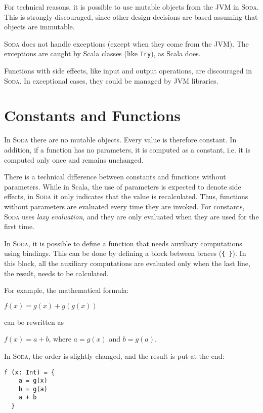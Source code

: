 \documentclass[12pt,a4paper]{book}
\newcommand{\srccode}[1]{\texttt{{#1}}}
\newcommand{\Soda}{\textsc{Soda}\xspace}
\begin{document}
    For technical reasons, it is possible to use mutable objects from the JVM in \Soda.
    This is strongly discouraged, since other design decisions are based assuming that objects are immutable.

    \Soda does not handle exceptions (except when they come from the JVM).
    The exceptions are caught by Scala classes (like \srccode{Try}), as Scala does.

    Functions with side effects, like input and output operations, are discouraged in \Soda.
    In exceptional cases, they could be managed by JVM libraries.


    \section{Constants and Functions}

    In \Soda there are no mutable objects.
    Every value is therefore constant.
    In addition, if a function has no parameters, it is computed as a constant, i.e. it is computed only once and remains unchanged.

    There is a technical difference between constants and functions without parameters.
    While in Scala, the use of parameters is expected to denote side effects, in \Soda it only indicates that the value is recalculated.
    Thus, functions without parameters are evaluated every time they are invoked.
    For constants, \Soda uses \textit{lazy evaluation}, and they are only evaluated when they are used for the first time.

    In \Soda, it is possible to define a function that needs auxiliary computations using bindings.
    This can be done by defining a block between braces (\srccode{\{ \}}).
    In this block, all the auxiliary computations are evaluated only when the last line, the result, needs to be calculated.

    For example, the mathematical formula:
    \begin{center}
        $f(x) = g(x) + g(g(x))$
    \end{center}
    can be rewritten as
    \begin{center}
        $f(x) = a + b$, where $a = g(x)$ and $b = g(a)$.
    \end{center}

    In \Soda, the order is slightly changed, and the result is put at the end:
    \begin{lstlisting}[label={lst:exampleFunctionWithBraces}]
  f (x: Int) = {
    a = g(x)
    b = g(a)
    a + b
  }
    \end{lstlisting}
\end{document}
